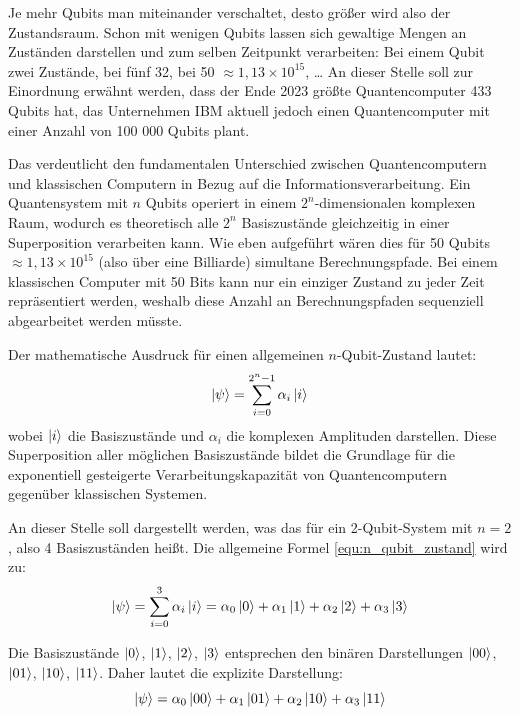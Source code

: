 Je mehr Qubits man miteinander verschaltet, desto größer wird also der Zustandsraum. Schon mit wenigen Qubits lassen sich gewaltige Mengen an Zuständen darstellen und zum selben Zeitpunkt verarbeiten: Bei einem Qubit zwei Zustände, bei fünf 32, bei 50 \(\approx 1{,}13 \times 10^{15}\), \dots
An dieser Stelle soll zur Einordnung erwähnt werden, dass der Ende 2023 größte Quantencomputer 433 Qubits hat, das Unternehmen IBM aktuell jedoch einen Quantencomputer mit einer Anzahl von 100 000 Qubits plant.

Das verdeutlicht den fundamentalen Unterschied zwischen Quantencomputern und klassischen Computern in Bezug auf die Informationsverarbeitung. Ein Quantensystem mit $n$ Qubits operiert in einem $2^n$-dimensionalen komplexen Raum, wodurch es theoretisch alle $2^n$ Basiszustände gleichzeitig in einer Superposition verarbeiten kann. Wie eben aufgeführt wären dies für 50 Qubits \(\approx 1{,}13 \times 10^{15}\) (also über eine Billiarde) simultane Berechnungspfade. Bei einem klassischen Computer mit 50 Bits kann nur ein einziger Zustand zu jeder Zeit repräsentiert werden, weshalb diese Anzahl an Berechnungspfaden sequenziell abgearbeitet werden müsste.

Der mathematische Ausdruck für einen allgemeinen $n$-Qubit-Zustand lautet:
\begin{equation}
\ket{\psi} = \sum_{i=0}^{2^n-1} \alpha_i \ket{i}
\label{equ:n_qubit_zustand}
\end{equation}
wobei $\ket{i}$ die Basiszustände und $\alpha_i$ die komplexen Amplituden darstellen. Diese Superposition aller möglichen Basiszustände bildet die Grundlage für die exponentiell gesteigerte Verarbeitungskapazität von Quantencomputern gegenüber klassischen Systemen.

An dieser Stelle soll dargestellt werden, was das für ein 2-Qubit-System mit $n = 2$, also 4 Basiszuständen heißt. Die allgemeine Formel \ref{equ:n_qubit_zustand}
wird zu:
\begin{equation}
\ket{\psi} = \sum_{i=0}^{3} \alpha_i \ket{i} = \alpha_0 \ket{0} + \alpha_1 \ket{1} + \alpha_2 \ket{2} + \alpha_3 \ket{3}
\end{equation}

Die Basiszustände $\ket{0}$, $\ket{1}$, $\ket{2}$, $\ket{3}$ entsprechen den binären Darstellungen $\ket{00}$, $\ket{01}$, $\ket{10}$, $\ket{11}$. Daher lautet die explizite Darstellung:
\begin{equation}
\ket{\psi} = \alpha_0 \ket{00} + \alpha_1 \ket{01} + \alpha_2 \ket{10} + \alpha_3 \ket{11}
\end{equation}

